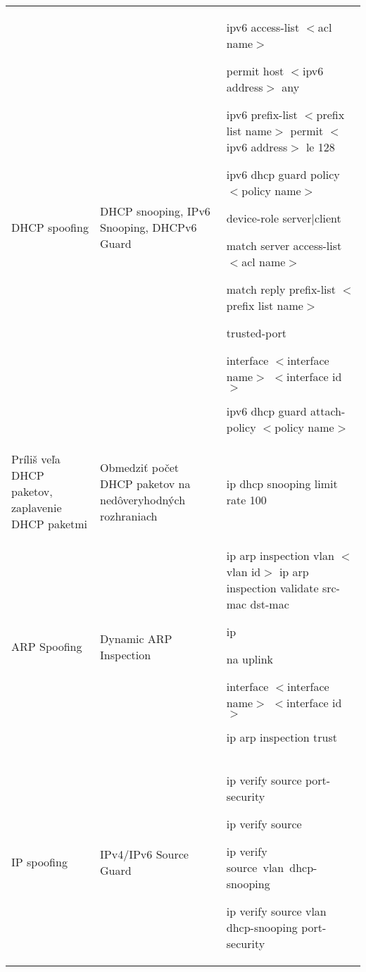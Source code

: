 \begin{longtable}[!htbp]{|L{10em}L{10em}>{\selectfont}L{34em}|}
	
	
	 DHCP spoofing	&DHCP snooping, IPv6 Snooping, DHCPv6 Guard	&ipv6 access-list $<$acl name$>$
	
	\hspace{0.5em}permit host $<$ipv6 address$>$ any
	
	ipv6 prefix-list $<$prefix list name$>$ permit $<$ipv6 address$>$  le 128
	
	ipv6 dhcp guard policy $<$policy name$>$
	
	\hspace{0.5em}device-role server|client
	
	\hspace{0.5em}match server access-list $<$acl name$>$
	
	\hspace{0.5em}match reply prefix-list $<$prefix list name$>$
	
	\hspace{0.5em}trusted-port
	
	interface $<$interface name$>$ $<$interface id$>$
	
	\hspace{0.5em}ipv6 dhcp guard attach-policy $<$policy name$>$\\
	
	
	
	
	Príliš veľa DHCP paketov, zaplavenie DHCP paketmi	&Obmedziť počet DHCP paketov na nedôveryhodných rozhraniach	&ip dhcp snooping limit rate 100 \\
	
	
	
	 ARP Spoofing	&Dynamic ARP Inspection	&ip arp inspection vlan $<$vlan id$>$ 
	ip arp inspection validate src-mac dst-mac 
	
	\hspace{0.5em}ip
	
	{\selectfont na uplink}
	
	interface $<$interface name$>$ $<$interface id$>$
	
	\hspace{0.5em}ip arp inspection trust\\
	
	
	
	
	IP spoofing	&IPv4/IPv6 Source Guard	&ip verify source port-security
	
	ip verify source
	
	ip verify source vlan dhcp-snooping
	
	ip verify source vlan dhcp-snooping port-security
	

\end{longtable}
